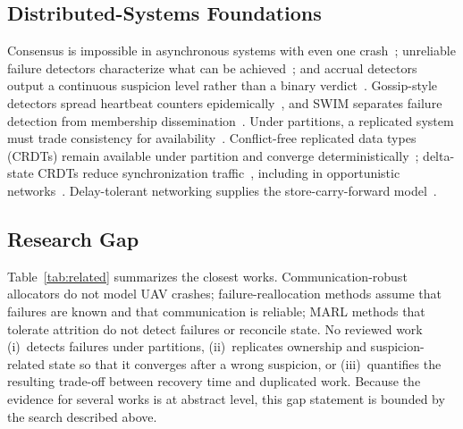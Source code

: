 \documentclass[journal]{IEEEtran}
\begin{document}
\subsection{Distributed-Systems Foundations}
Consensus is impossible in asynchronous systems with even one crash~\cite{R05_fischer1985}; unreliable failure detectors characterize what can be achieved~\cite{R06_chandra1996}; and accrual detectors output a continuous suspicion level rather than a binary verdict~\cite{R07_hayashibara2004}. Gossip-style detectors spread heartbeat counters epidemically~\cite{R74_renesse1998}, and SWIM separates failure detection from membership dissemination~\cite{R08_das2002}. Under partitions, a replicated system must trade consistency for availability~\cite{R09_gilbert2002}. Conflict-free replicated data types (CRDTs) remain available under partition and converge deterministically~\cite{R10_shapiro2011,R11_almeida2024}; delta-state CRDTs reduce synchronization traffic~\cite{R73_almeida2018}, including in opportunistic networks~\cite{R12_guidec2022,R72_guidec2026}. Delay-tolerant networking supplies the store-carry-forward model~\cite{R13_fall2003,R14_spyropoulos2005,R19_xiong2019}.

\subsection{Research Gap}
Table~\ref{tab:related} summarizes the closest works. Communication-robust allocators do not model UAV crashes; failure-reallocation methods assume that failures are known and that communication is reliable; MARL methods that tolerate attrition do not detect failures or reconcile state. No reviewed work (i)~detects failures under partitions, (ii)~replicates ownership and suspicion-related state so that it converges after a wrong suspicion, or (iii)~quantifies the resulting trade-off between recovery time and duplicated work. Because the evidence for several works is at abstract level, this gap statement is bounded by the search described above.
\end{document}
